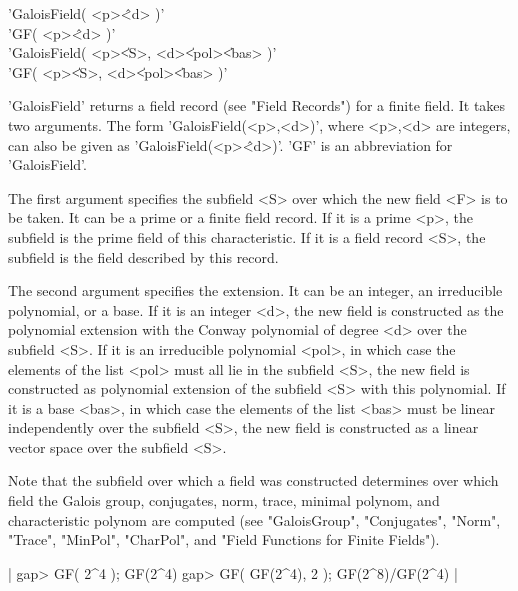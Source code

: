 %

'GaloisField( <p>\^<d> )' \\
'GF( <p>\^<d> )' \\
'GaloisField( <p>\|<S>, <d>\|<pol>\|<bas> )' \\
'GF( <p>\|<S>, <d>\|<pol>\|<bas> )'

'GaloisField' returns a  field record (see  "Field Records") for a finite
field.  It takes two arguments.  The form  'GaloisField(<p>,<d>)',  where
<p>,<d> are integers, can also be given as 'GaloisField(<p>\^<d>)'.  'GF'
is an abbreviation for 'GaloisField'.

The first argument  specifies the subfield <S>  over which the new  field
<F> is to be taken.  It can be  a prime or  a finite field record.  If it
is a prime <p>, the  subfield is the  prime field of this characteristic.
If it is a field record <S>, the subfield is the  field described by this
record.

The  second  argument specifies the extension.  It can be an integer,  an
irreducible polynomial, or a base.   If  it is an  integer  <d>, the  new
field  is  constructed  as  the  polynomial  extension  with  the  Conway
polynomial  of degree <d> over the subfield <S>.  If it is an irreducible
polynomial <pol>,  in which case the elements  of the list <pol> must all
lie  in  the  subfield <S>, the new field  is  constructed as  polynomial
extension  of the  subfield <S> with  this  polynomial.  If  it is a base
<bas>,  in which  case  the elements  of  the list <bas>  must be  linear
independently  over the  subfield  <S>,  the  new field is constructed as
a linear vector space over the subfield <S>.

Note that the subfield over which a field was constructed determines over
which field the Galois group, conjugates, norm,  trace,  minimal polynom,
and characteristic polynom are computed (see "GaloisGroup", "Conjugates",
"Norm", "Trace", "MinPol", "CharPol", and   "Field  Functions for  Finite
Fields").

|    gap> GF( 2^4 );
    GF(2^4)
    gap> GF( GF(2^4), 2 );
    GF(2^8)/GF(2^4) |

%
%
%
%

